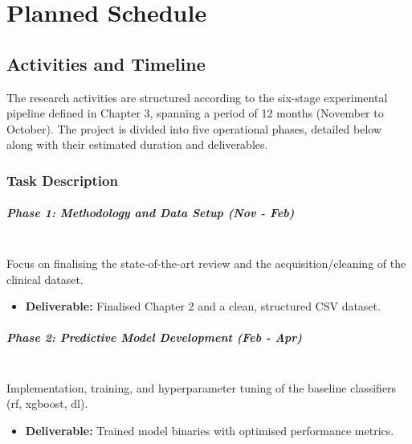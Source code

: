 \chapter{Planned Schedule}

\section{Activities and Timeline}
The research activities are structured according to the six-stage experimental pipeline defined in Chapter 3, spanning a period of 12 months (November to October). The project is divided into five operational phases, detailed below along with their estimated duration and deliverables.


\newlength{\ganttcolwidth}
\setlength{\ganttcolwidth}{\dimexpr(\textwidth-4.5cm)/12\relax}

\subsection{Task Description}

\paragraph{Phase 1: Methodology and Data Setup (Nov - Feb)} \mbox{} \\
Focus on finalising the state-of-the-art review and the acquisition/cleaning of the clinical dataset.
\begin{itemize}
    \item \textbf{Deliverable:} Finalised Chapter 2 and a clean, structured CSV dataset.
\end{itemize}

\paragraph{Phase 2: Predictive Model Development (Feb - Apr)} \mbox{} \\
Implementation, training, and hyperparameter tuning of the baseline classifiers (\gls{rf}, \gls{xgboost}, \gls{dl}).
\begin{itemize}
    \item \textbf{Deliverable:} Trained model binaries with optimised performance metrics.
\end{itemize}

